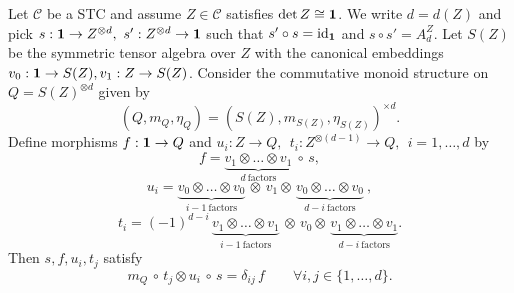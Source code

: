\documentclass[11pt]{article}
\theoremstyle{definition}
\theoremstyle{definition}
\theoremstyle{remark}
\def\2#1{{\mathcal #1}}
\def\1#1{{\bf #1}}
\newcommand{\mcirc}{\,\circ\,}
\newcommand{\rarr}{\rightarrow}
\def\id{\mathrm{id}}
\begin{document}
\blemma \label{lem-det}
Let $\2C$ be a STC and assume $Z\in\2C$ satisfies $\det Z\cong\11$. We write $d=d(Z)$ and pick 
$s: \11\rarr Z^{\otimes d},\ s': Z^{\otimes d}\rarr\11$ such that $s'\circ s=\id_\11$ and
$s\circ s'=A_d^Z$. Let $S(Z)$ be the symmetric tensor algebra over $Z$ with the canonical 
embeddings $v_0:\11\rarr S(Z), v_1: Z\rarr S(Z)$.   
Consider the commutative monoid structure on $Q=S(Z)^{\otimes d}$ given by 
\[ (Q,m_Q,\eta_Q) = (S(Z),m_{S(Z)},\eta_{S(Z)})^{\times d}. \]
Define morphisms $f: \11\rarr Q$ and 
$u_i: Z\rarr Q,\ \ t_i: Z^{\otimes (d-1)}\rarr Q,\ \ i=1,\ldots,d$ by
\[ f= \underbrace{v_1\otimes \ldots\otimes v_1}_{d\ {\scriptstyle\mbox{factors}}}\ \circ\,s, \]
\[ u_i=\underbrace{v_0\otimes\ldots\otimes v_0}_{i-1\ {\scriptstyle \mbox{factors}}}\,\otimes\, v_1
   \otimes\,\underbrace{v_0\otimes\ldots\otimes v_0}_{d-i\ {\scriptstyle \mbox{factors}}}\ ,
\]
\[ t_i= (-1)^{d-i}\, \underbrace{v_1\otimes\ldots\otimes v_1}_{i-1\ {\scriptstyle \mbox{factors}}}  
  \,\otimes\, v_0 \otimes\,\underbrace{v_1\otimes\ldots\otimes v_1}_{d-i\ 
   {\scriptstyle \mbox{factors}}}. 
\]
Then $s,f,u_i,t_j$ satisfy
\begin{equation} \label{e-tu}
   m_Q\mcirc t_j\otimes u_i\mcirc s=\delta_{ij}\,f \quad\quad\forall i,j\in\{1,\ldots,d\}.
\end{equation}
\elemma
\end{document}
